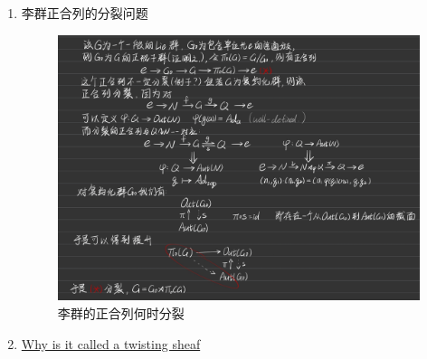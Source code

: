 \begin{enumerate}
    \item 李群正合列的分裂问题
    \begin{figure}[htpb]
        \centering
        \includegraphics[scale = 0.18]{Figures/20240926-223647.jpg}
        \caption{李群的正合列何时分裂}
    \end{figure}
    \item \href{https://twistedcubic.wordpress.com/2009/01/23/why-is-it-called-a-twisting-sheaf/}{Why is it called a twisting sheaf}
\end{enumerate}